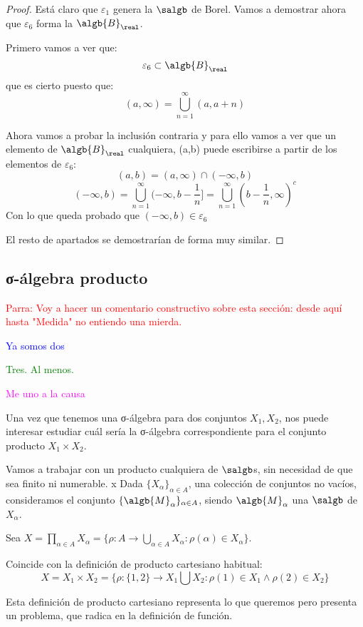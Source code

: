 \documentclass{apuntes}
\begin{document}
\begin{proof}
Está claro que $\varepsilon_1$ genera la $\salgb$ de Borel. Vamos a demostrar ahora que $\varepsilon_6$ forma la $\algb{B}_\real$.

Primero vamos a ver que:
\[\varepsilon_6 \subset \algb{B}_\real\]
que es cierto puesto que:
\[(a, \infty) = \bigcup_{n=1}^{\infty}(a,a+n)\]

Ahora vamos a probar la inclusión contraria y para ello vamos a ver que un elemento de $\algb{B}_\real$ cualquiera, (a,b) puede escribirse a partir de los elementos de $\varepsilon_6$:
\[(a,b) = (a, \infty) \cap (-\infty, b)\]
\[(-\infty, b) = \bigcup_{n=1}^{\infty}(- \infty, b - \frac{1}{n}]=\bigcup_{n=1}^{\infty}(b-\frac{1}{n}, \infty)^c\]
Con lo que queda probado que $(-\infty, b) \in \varepsilon_6$

El resto de apartados se demostrarían de forma muy similar.
\end{proof}

\subsection{{σ}-álgebra producto}
\textcolor{red}{Parra: Voy a hacer un comentario constructivo sobre esta sección: desde aquí hasta "Medida" no entiendo una mierda.}

\textcolor{blue}{Ya somos dos}

\textcolor{green}{Tres. Al menos.}

\textcolor{magenta}{Me uno a la causa}

Una vez que tenemos una σ-álgebra para dos conjuntos $X_1, X_2$, nos puede interesar estudiar cuál sería la σ-álgebra correspondiente para el conjunto producto $X_1×X_2$.

Vamos a trabajar con un producto cualquiera de $\salgb$s, sin necesidad de que sea finito ni numerable.
x
Dada $\{X_\alpha\}_{\alpha\in A}$, una colección de conjuntos no vacíos, consideramos el conjunto $\{\algb{M}_\alpha\}_{\alpha\in A}$, siendo $\algb{M}_\alpha$ una $\salgb$ de $X_\alpha$.

Sea $X=\prod_{\alpha\in A}X_\alpha=\{\rho: A \rightarrow \bigcup_{\alpha\in A} X_\alpha : \rho(\alpha)\in X_\alpha\}$.


\obs Coincide con la definición de producto cartesiano habitual: \[X=X_1\times X_2=\{\rho: \{1,2\} \rightarrow X_1 \bigcup X_2 : \rho(1)\in X_1 \wedge \rho(2) \in X_2\}\]

Esta definición de producto cartesiano representa lo que queremos pero presenta un problema, que radica en la definición de función.
\end{document}
